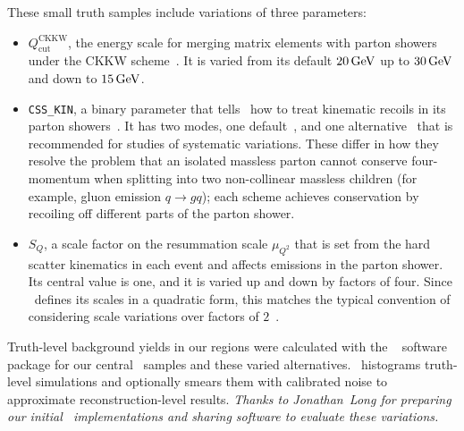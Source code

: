 These small truth samples include variations of three parameters:
\begin{itemize}
\item $Q_\textrm{cut}^\textrm{CKKW}$, the energy scale for merging
matrix elements with parton showers under the CKKW
scheme~\cite{Catani_2001_CKKW,Hoeche:2009rj}.
It is varied from its default $20\,\eV[G]$ up to $30\,\eV[G]$ and down
to $15\,\eV[G]$.
\item \texttt{CSS\_KIN}, a binary parameter that tells \sherpa\ how to treat
kinematic recoils in its parton showers~\cite{sherpa_222_manual}.
It has two modes, one default~\cite{Hoeche:2009rj}, and one
alternative~\cite{Hoeche:2009xc}
that is recommended for studies of systematic variations.
These differ in how they resolve the problem that an isolated massless parton
cannot conserve four-momentum when splitting into two non-collinear massless
children (for example, gluon emission $q\to gq$);
each scheme achieves conservation by recoiling off different parts of the
parton shower.
\item $S_Q$, a scale factor on the resummation scale $\mu_{Q^2}$ that is set
from the hard scatter kinematics in each event and affects emissions in the
parton shower.
Its central value is one, and it is varied up and down by factors of four.
Since \sherpa\ defines its scales in a quadratic form, this matches the typical
convention of considering scale variations over factors of
$2$~\cite{sherpa_222_manual,Bothmann:2019yzt}.
\end{itemize}
Truth-level background yields in our regions were calculated with the
\simpleanalysis~\cite{Lorenz:2752450,simpleanalysis_cern}
software package for
our central \diboson\ samples and these varied alternatives.
\simpleanalysis\ histograms truth-level simulations and optionally smears them
with calibrated noise to approximate reconstruction-level results.
\emph{Thanks to Jonathan~Long for preparing our initial
\simpleanalysis\ implementations and sharing software to evaluate these
variations.}

